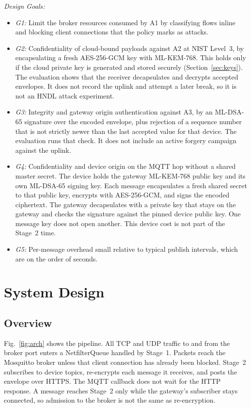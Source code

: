 \documentclass[journal]{IEEEtran}
\begin{document}
\textit{Design Goals:}
\begin{itemize}
  \item \textit{G1:} Limit the broker resources consumed by A1 by classifying flows inline and blocking client connections that the policy marks as attacks.
  \item \textit{G2:} Confidentiality of cloud-bound payloads against A2 at NIST Level~3, by encapsulating a fresh AES-256-GCM key with ML-KEM-768. This holds only if the cloud private key is generated and stored securely (Section~\ref{sec:keys}). The evaluation shows that the receiver decapsulates and decrypts accepted envelopes. It does not record the uplink and attempt a later break, so it is not an HNDL attack experiment.
  \item \textit{G3:} Integrity and gateway origin authentication against A3, by an ML-DSA-65 signature over the encoded envelope, plus rejection of a sequence number that is not strictly newer than the last accepted value for that device. The evaluation runs that check. It does not include an active forgery campaign against the uplink.
  \item \textit{G4:} Confidentiality and device origin on the MQTT hop without a shared master secret. The device holds the gateway ML-KEM-768 public key and its own ML-DSA-65 signing key. Each message encapsulates a fresh shared secret to that public key, encrypts with AES-256-GCM, and signs the encoded ciphertext. The gateway decapsulates with a private key that stays on the gateway and checks the signature against the pinned device public key. One message key does not open another. This device cost is not part of the Stage~2 time.
  \item \textit{G5:} Per-message overhead small relative to typical publish intervals, which are on the order of seconds.
\end{itemize}

\section{System Design}
\label{sec:design}

\subsection{Overview}

Fig.~\ref{fig:arch} shows the pipeline. All TCP and UDP traffic to and from the broker port enters a NetfilterQueue handled by Stage~1. Packets reach the Mosquitto broker unless that client connection has already been blocked. Stage~2 subscribes to device topics, re-encrypts each message it receives, and posts the envelope over HTTPS. The MQTT callback does not wait for the HTTP response. A message reaches Stage~2 only while the gateway's subscriber stays connected, so admission to the broker is not the same as re-encryption.
\end{document}
